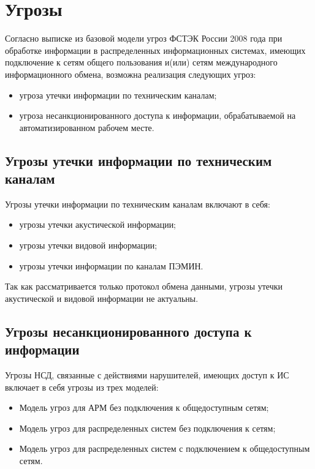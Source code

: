 \newpage
\section{Угрозы}
\setcounter{figure}{0}

Согласно выписке из базовой модели угроз ФСТЭК России 2008 года \cite{threats} при обработке информации в распределенных информационных системах, имеющих подключение к сетям общего пользования и(или) сетям международного информационного обмена, возможна реализация следующих угроз:

\begin{itemize}
 \item угроза утечки информации по техническим каналам;
 \item угроза несанкционированного доступа к информации, обрабатываемой на автоматизированном рабочем месте.
\end{itemize}

\subsection{Угрозы утечки информации по техническим каналам}

Угрозы утечки информации по техническим каналам включают в себя:

\begin{itemize}
 \item угрозы утечки акустической информации;
 \item угрозы утечки видовой информации;
 \item угрозы утечки информации по каналам ПЭМИН.
\end{itemize}

Так как рассматривается только протокол обмена данными, угрозы утечки акустической и видовой информации не актуальны.

\subsection{Угрозы несанкционированного доступа к информации}

Угрозы НСД, связанные с действиями нарушителей, имеющих доступ к ИС включает в себя угрозы из трех моделей:

\begin{itemize}
 \item Модель угроз для АРМ без подключения к общедоступным сетям;
 \item Модель угроз для распределенных систем без подключения к сетям;
 \item Модель угроз для распределенных систем с подключением к общедоступным сетям.
\end{itemize}

